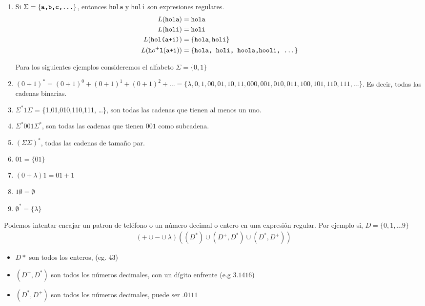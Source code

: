 \begin{enumerate}
    \item Si $\Sigma = \{\texttt{a,b,c,\dots}\}$, entonces \texttt{hola} y \texttt{holi} son expresiones regulares. 
    \begin{align*}
        L(\texttt{hola}) &= \texttt{hola} \\ 
        L(\texttt{holi}) &= \texttt{holi} \\
        L(\texttt{hol(a+i)}) &= \{\texttt{hola}, \texttt{holi}\} \\
        L(\texttt{h}o^+\texttt{l}(\texttt{a+i})) &= \{\texttt{hola, \texttt{holi}, \texttt{hoola},\texttt{hooli}, \dots }\}
    \end{align*}

    Para los siguientes ejemplos consideremos el alfabeto $\Sigma=\{0,1\}$

    \item $(0+1)^* = (0 +1)^0 + (0+1)^1 + (0+1)^2 + \dots = \{\lambda, 0, 1, 00, 01, 10, 11, 000, 001, 010, 011, 100, 101, 110, 111, \dots\}$. Es decir, todas las cadenas binarias.
    \item $\Sigma^*1\Sigma$ = \{1,01,010,110,111, \dots\}, son todas las cadenas que tienen al menos un uno. 
    \item $\Sigma^*001\Sigma^*$, son todas las cadenas que tienen $001$ como subcadena. 
    \item $(\Sigma\Sigma)^*$, todas las cadenas de tamaño par. 
    \item $01 = \{01\}$
    \item $(0 + \lambda)1 = 01 + 1$
    \item $1\emptyset = \emptyset$
    \item $\emptyset^* = \{\lambda\}$

\end{enumerate}

    Podemos intentar encajar un patron de teléfono o un número decimal o entero en una 
    expresión regular. Por ejemplo si, $D=\{0,1, \dots 9\}$
\begin{align*}
    (+ \cup - \cup \lambda)((D^*) \cup (D^+,D^*) \cup (D^*,D^+))
\end{align*}

\begin{itemize}
    \item $D*$ son todos los enteros, (eg. $43$)
    \item $(D^+,D^*)$ son todos los números decimales, con un dígito enfrente (e.g $3.1416$)
    \item $(D^*,D^+)$ son todos los números decimales, puede ser $.0111$ 
\end{itemize}

